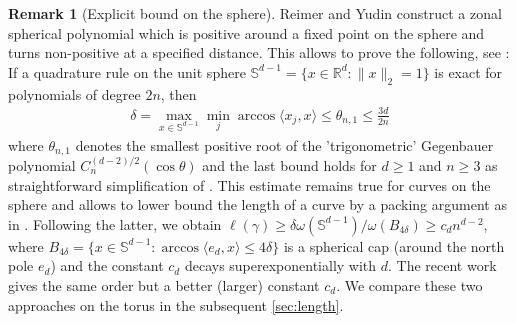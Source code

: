 \documentclass[11pt,a4paper,twoside,final,biblatex]{scrartcl}
\renewcommand{\S}{\ensuremath{\mathbb{S}}}
\newcommand{\R}{\ensuremath{\mathbb{R}}}
\theoremstyle{definition}
\newtheorem{remark}[theorem]{Remark}
\numberwithin{equation}{section}
\numberwithin{table}{section}
\numberwithin{figure}{section}
\begin{document}
\begin{remark}[Explicit bound on the sphere]
Reimer and Yudin construct a zonal spherical polynomial 
which is positive around a fixed point on the sphere and turns non-positive at a specified distance.
This allows to prove the following, see \cite[Thm.~6.21]{Re03}:
If a quadrature rule on the unit sphere $\S^{d-1}=\{x\in\R^d:\|x\|_2=1\}$ is exact for polynomials of degree $2n$, then 
\begin{align*}
 \delta=\max_{x\in\S^{d-1}}\min_j \arccos\langle x_j,x\rangle \le \theta_{n,1}
 \le\frac{3d}{2n}
\end{align*}
where $\theta_{n,1}$ denotes the smallest positive root of the 'trigonometric' Gegenbauer polynomial $C_n^{(d-2)/2}(\cos\theta)$ and the last bound holds for $d\ge 1$ and $n\ge 3$ as straightforward simplification of \cite[Thm.~1.1]{Ni19}. This estimate remains true for curves on the sphere and allows to lower bound the length of a curve by a packing argument as in \cite[second part of the proof of Thm.~2.2]{EhGr23}.
Following the latter, we obtain $\ell(\gamma)\ge\delta \omega(\S^{d-1})/\omega(B_{4\delta})\ge c_d n^{d-2}$, where $B_{4\delta}=\{x\in\S^{d-1}:\arccos\langle e_d,x\rangle\le 4\delta\}$ is a spherical cap (around the north pole $e_d$) and the constant $c_d$ decays superexponentially with $d$.
The recent work \cite{EhGr26} gives the same order but a better (larger) constant $c_d$. We compare these two approaches on the torus in the subsequent \cref{sec:length}.
\end{remark}
\end{document}
